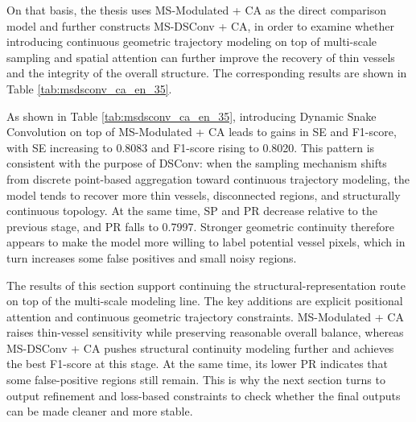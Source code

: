 \documentclass[a4paper,11pt]{article}
\begin{document}
On that basis, the thesis uses MS-Modulated + CA as the direct comparison model and further constructs MS-DSConv + CA, in order to examine whether introducing continuous geometric trajectory modeling on top of multi-scale sampling and spatial attention can further improve the recovery of thin vessels and the integrity of the overall structure. The corresponding results are shown in Table \ref{tab:msdsconv_ca_en_35}.

\begin{table}[!htbp]
\centering
\caption{Comparison between MS-Modulated + CA and MS-DSConv + CA}
\label{tab:msdsconv_ca_en_35}
\end{table}

As shown in Table \ref{tab:msdsconv_ca_en_35}, introducing Dynamic Snake Convolution on top of MS-Modulated + CA leads to gains in SE and F1-score, with SE increasing to 0.8083 and F1-score rising to 0.8020. This pattern is consistent with the purpose of DSConv: when the sampling mechanism shifts from discrete point-based aggregation toward continuous trajectory modeling, the model tends to recover more thin vessels, disconnected regions, and structurally continuous topology. At the same time, SP and PR decrease relative to the previous stage, and PR falls to 0.7997. Stronger geometric continuity therefore appears to make the model more willing to label potential vessel pixels, which in turn increases some false positives and small noisy regions.

The results of this section support continuing the structural-representation route on top of the multi-scale modeling line. The key additions are explicit positional attention and continuous geometric trajectory constraints. MS-Modulated + CA raises thin-vessel sensitivity while preserving reasonable overall balance, whereas MS-DSConv + CA pushes structural continuity modeling further and achieves the best F1-score at this stage. At the same time, its lower PR indicates that some false-positive regions still remain. This is why the next section turns to output refinement and loss-based constraints to check whether the final outputs can be made cleaner and more stable.
\end{document}
